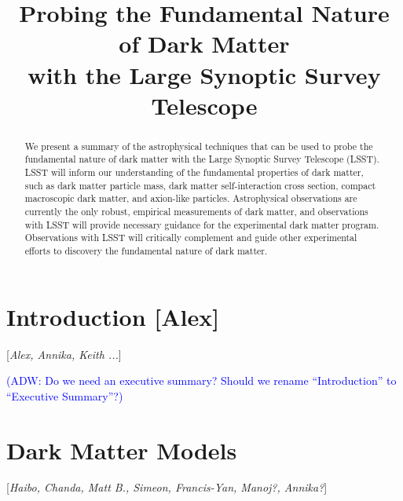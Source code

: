 \documentclass[modern,linenumbers]{aastex62}
\newcommand{\Contributors}[1]{ {\footnotesize [\textit{#1}]}}
\newcommand{\Contact}[1]{ {\footnotesize [\textbf{#1}]}}
\newcommand{\Comment}[3]{\textcolor{#1}{(#2: #3)}}
\newcommand{\ADW}[1]{\Comment{blue}{ADW}{#1}} %
\begin{document}
\title{\Large Probing the Fundamental Nature of Dark Matter \\
with the Large Synoptic Survey Telescope}



\begin{abstract}
We present a summary of the astrophysical techniques that can be used to probe the fundamental nature of dark matter with the Large Synoptic Survey Telescope (LSST). 
LSST will inform our understanding of the fundamental properties of dark matter, such as dark matter particle mass, dark matter self-interaction cross section, compact macroscopic dark matter, and axion-like particles.
Astrophysical observations are currently the only robust, empirical measurements of dark matter, and observations with LSST will provide necessary guidance for the experimental dark matter program.
Observations with LSST will critically complement and guide other experimental efforts to discovery the fundamental nature of dark matter.
\end{abstract}

\tableofcontents 


\section{Introduction \Contact{Alex}}
\Contributors{Alex, Annika, Keith ...}
\label{sec:intro}

\ADW{Do we need an executive summary? Should we rename ``Introduction'' to ``Executive Summary''?}




\section{Dark Matter Models}
\Contributors{Haibo, Chanda, Matt B., Simeon, Francis-Yan, Manoj?, Annika?}
\label{sec:theory}



\end{document}
